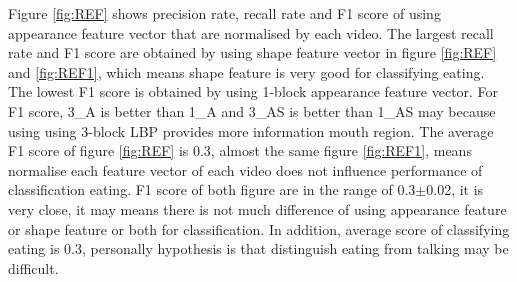Figure \ref{fig:REF} shows precision rate, recall rate and F1 score of using appearance feature vector that are normalised by each video. The largest recall rate and F1 score are obtained by using shape feature vector in figure \ref{fig:REF} and \ref{fig:REF1}, which means shape feature is very good for classifying eating. The lowest F1 score is obtained by using 1-block appearance feature vector. For F1 score, 3\_A is better than 1\_A and 3\_AS is better than 1\_AS may because using using 3-block LBP provides more information mouth region. The average F1 score of figure \ref{fig:REF} is 0.3, almost the same figure \ref{fig:REF1}, means normalise each feature vector of each video does not influence performance of classification eating. F1 score of both figure are in the range of 0.3$\pm$0.02, it is very close, it may means there is not much difference of using appearance feature or shape feature or both for classification. In addition,  average score of classifying eating is 0.3, personally hypothesis is that distinguish eating from talking may be difficult. 
